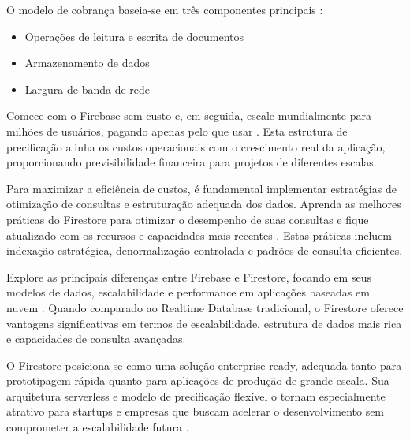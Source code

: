 O modelo de cobrança baseia-se em três componentes principais \cite{firebase_pricing}:
\begin{itemize}
	\item Operações de leitura e escrita de documentos
	\item Armazenamento de dados
	\item Largura de banda de rede
\end{itemize}

Comece com o Firebase sem custo e, em seguida, escale mundialmente para milhões de usuários, pagando apenas pelo que usar \cite{firebase_pricing}. Esta estrutura de precificação alinha os custos operacionais com o crescimento real da aplicação, proporcionando previsibilidade financeira para projetos de diferentes escalas.

Para maximizar a eficiência de custos, é fundamental implementar estratégias de otimização de consultas e estruturação adequada dos dados. Aprenda as melhores práticas do Firestore para otimizar o desempenho de suas consultas e fique atualizado com os recursos e capacidades mais recentes \cite{estuary_firestore_best_practices}. Estas práticas incluem indexação estratégica, denormalização controlada e padrões de consulta eficientes.

Explore as principais diferenças entre Firebase e Firestore, focando em seus modelos de dados, escalabilidade e performance em aplicações baseadas em nuvem \cite{airbyte_firebase_vs_firestore}. Quando comparado ao Realtime Database tradicional, o Firestore oferece vantagens significativas em termos de escalabilidade, estrutura de dados mais rica e capacidades de consulta avançadas.

O Firestore posiciona-se como uma solução enterprise-ready, adequada tanto para prototipagem rápida quanto para aplicações de produção de grande escala. Sua arquitetura serverless e modelo de precificação flexível o tornam especialmente atrativo para startups e empresas que buscam acelerar o desenvolvimento sem comprometer a escalabilidade futura \cite{firebase_io_2024}.

